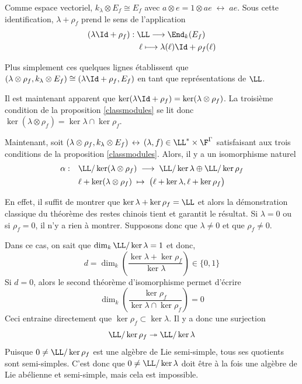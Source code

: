 Comme espace vectoriel, $k_\lambda \otimes E_f \cong E_f$ avec $a \otimes e = 1 \otimes ae \; \leftrightarrow \; ae$. Sous cette identification, $\lambda + \rho_f$ prend le sens de l'application
\begin{align*}
(\lambda\Id + \rho_f) : \; &\LL \longrightarrow \End_k(E_f) \\
&\; \ell \longmapsto \lambda(\ell)\Id + \rho_f(\ell)
\end{align*}

Plus simplement ces quelques lignes établissent que $(\lambda \otimes \rho_f, k_\lambda \otimes E_f) \cong (\lambda \Id + \rho_f,E_f)$ en tant que représentations de $\LL$.
\begin{Rem} Il est maintenant apparent que $\ker(\lambda \Id + \rho_f) = \ker(\lambda \otimes \rho_f)$. La troisième condition de la proposition \ref{classmodules} se lit donc  $ \ker(\lambda \otimes \rho_f) = \ker \lambda \cap \ker \rho_f $.
\end{Rem}

Maintenant, soit $(\lambda \otimes \rho_f,k_\lambda \otimes E_f) \, \leftrightarrow \, (\lambda, f) \in \LL^* \times \F^\Gamma$ satisfaisant aux trois conditions de la proposition \ref{classmodules}. Alors, il y a un isomorphisme naturel
\begin{align}
\label{restesChinois} \alpha : \quad &\LL / \ker(\lambda \otimes \rho_f) \; \longrightarrow \; \LL / \ker \lambda \oplus \LL/\ker \rho_f \\
&\ell + \ker(\lambda \otimes \rho_f) \; \mapsto \; \big(\ell + \ker \lambda,\ell + \ker \rho_f\big) \nonumber
\end{align}

En effet, il suffit de montrer que $\ker \lambda + \ker \rho_f = \LL$ et alors la démonstration classique du théorème des restes chinois tient et garantit le résultat. Si $\lambda = 0$ ou si $\rho_f = 0$, il n'y a rien à montrer. Supposons donc que $\lambda \neq 0$ et que $\rho_f \neq 0$.

Dans ce cas, on sait que $\dim_k \LL / \ker \lambda = 1$ et donc, 
$$ d = \dim_k \left(\frac{\ker \lambda + \ker \rho_f}{\ker \lambda}\right) \in \{0,1\} $$
Si $d = 0$, alors le second théorème d'isomorphisme permet d'écrire
$$ \dim_k \left(\frac{\ker \rho_f}{\ker \lambda \cap \ker \rho_f}\right) = 0 $$
Ceci entraine directement que $\ker \rho_f \subset \ker \lambda$. Il y a donc une surjection
$$ \LL / \ker \rho_f \twoheadrightarrow \LL / \ker \lambda $$
Puisque $0 \neq \LL / \ker \rho_f$ est une algèbre de Lie semi-simple, tous ses quotients sont semi-simples. C'est donc que $0 \neq \LL / \ker \lambda$ doit être à la fois une algèbre de Lie abélienne et semi-simple, mais cela est impossible.

